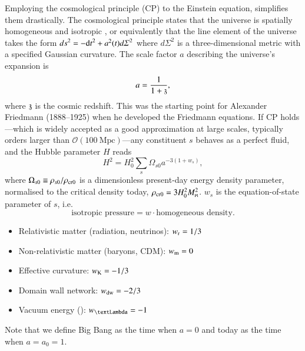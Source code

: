 




\newcommand*\pert{\ALIASpert}







Employing the cosmological principle (CP) to the Einstein equation, simplifies them drastically. The cosmological principle states that the universe is spatially homogeneous and isotropic%
, %
or equivalently that the line element of the universe takes the form 
${ds}^2 = -{\diff t}^2 + a^2(t){d\varSigma}^2$ where ${d\varSigma}^2$
is a three-dimensional metric with a specified Gaussian curvature. The scale factor $a$ describing the universe's expansion is %
\begin{equation}
    a = \frac{1}{1+\mathfrak{z}},
\end{equation}
where $\mathfrak{z}$ is the cosmic redshift. %
This was the starting point for Alexander Friedmann (1888--1925) when he developed the Friedmann equations. If CP holds---which is widely accepted as a good approximation at large scales, typically orders larger than $\mathscr{O}(100~\mathrm{Mpc})$---any constituent $s$ behaves as a perfect fluid, and the Hubble parameter $H$ reads %
\begin{equation}\label{eq:GR:lcdm:first_Friedmann}
    H^2 = H_0^2 \sum_s \Omega_{s0} a^{-3(1+w_s)},
\end{equation}
where $\Omega_{s0}\equiv \rho_{s0}/\rho_\mathrm{cr0}$ is a dimensionless present-day energy density parameter, normalised to the critical density today, $\rho_\mathrm{cr0}= 3H_0^2 M_{\text{\tiny{Pl}}}^2$. %
$w_s$ is the equation-of-state parameter of $s$, i.e. 
\[\text{isotropic pressure}= w \cdot \text{homogeneous density}.\]
\begin{itemize}
    \item Relativistic matter (radiation, neutrinos): $w_\mathrm{r}=1/3$
    \item Non-relativistic matter (baryons, CDM): $w_\mathrm{m}=0$ %
    \item Effective curvature: $w_\mathrm{K}=-1/3$
    \item Domain wall network: $w_\mathrm{dw}=-2/3$
    \item Vacuum energy (\textLambda): $w_{\text{\textLambda}} =-1$
\end{itemize}
Note that we define Big Bang as the time when $a=0$ and today as the time when $a=a_0=1$.

